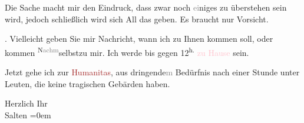 \pstart
           Die Sache macht mir den Eindruck, dass zwar noch \textcolor{gray}{ei}niges zu
               überstehen sein wird, jedoch schließlich wird sich All das geben. Es braucht nur
               Vorsicht.\pend
           
\pstart
           \label{K_L03149-2v}\label{K_L03149-2h}. Vielleicht geben Sie mir Nachricht, wann ich zu Ihnen kommen soll, oder
               kommen \substVorne{}\textsuperscript{N\textcolor{gray}{achm}}\substDazwischen{}selbst\substHinten{}{ }{\pb}zu mir. Ich werde bis gegen
                     12\textsuperscript{h.}{ }\textcolor{pink}{zu Hause}{}\ledrightnote{{$\rightarrow$}\textcolor{pink}{Hörlgasse}} sein.\pend
           
\pstart
           Jetzt gehe ich zur \textcolor{brown}{Humanitas}{}\ledrightnote{\textcolor{brown}{Oseh Chesed (Humanitas)}}, aus
                  dringende\textcolor{gray}{m} Bedürfnis nach einer Stunde unter Leuten, die keine
               tragischen Gebärden haben.\pend
           
\pstart
           Herzlich Ihr {\\[\baselineskip]}\spacefill\mbox{Salten}\pend
           \leftskip=0em{}\endnumbering{}  
      